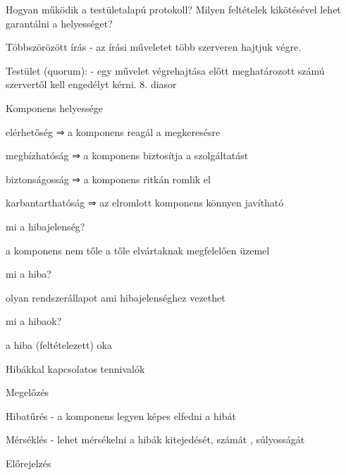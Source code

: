 \documentclass[12pt]{article}
\begin{document}
\begin{description}
                                    \item  Hogyan működik a testületalapú protokoll? Milyen feltételek kikötésével lehet garantálni a helyességet?
                                    \item Többszörözött írás
                                        - az írási műveletet több szerveren hajtjuk végre.
                                    \item Testület (quorum): 
                                        - egy művelet végrehajtása előtt meghatározott számú szervertől kell engedélyt kérni.
                                        8. diasor
                                    \item  Komponens helyessége
                                    \item elérhetőség       ⇒ a komponens reagál a megkeresésre
                                    \item megbízhatóság     ⇒ a komponens biztosítja a szolgáltatást
                                    \item biztonságosság    ⇒ a komponens ritkán romlik el
                                    \item karbantarthatóság ⇒ az elromlott komponens könnyen javítható
                                    \item  mi a hibajelenség?
                                    \item a komponens nem tőle a tőle elvártaknak megfelelően üzemel
                                    \item  mi a hiba?
                                    \item olyan rendszerállapot ami hibajelenséghez vezethet
                                    \item  mi a hibaok?
                                    \item a hiba (feltételezett) oka
                                    \item  Hibákkal kapcsolatos tennivalók
                                    \item Megelőzés
                                    \item Hibatűrés
                                        - a komponens legyen képes elfedni a hibát
                                    \item Mérséklés
                                        - lehet mérsékelni a hibák kitejedését, számát , súlyosságát
                                    \item Előrejelzés

\end{description}
\end{document}
